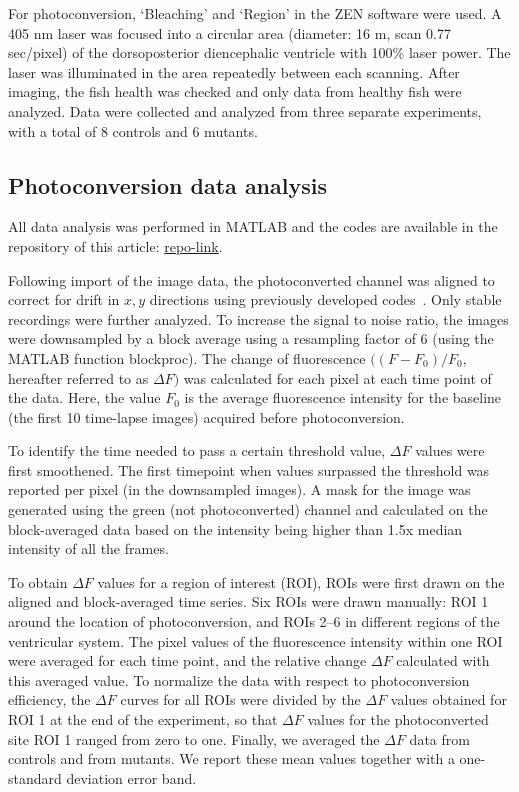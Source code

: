 \documentclass[fleqn]{wlscirep}
\begin{document}
For photoconversion, ‘Bleaching’ and ‘Region’ in the ZEN software
were used. A 405 nm laser was focused into a circular area (diameter: 16 \textmu m, scan 0.77 \textmu sec/pixel)
of the dorsoposterior diencephalic ventricle with 100\% laser power.
The laser was illuminated in the area repeatedly between each scanning.
After imaging, the fish health was checked and only data from healthy fish were analyzed.
Data were collected and analyzed from three separate experiments,
with a total of 8 controls and 6 mutants.

\subsection*{Photoconversion data analysis}
All data analysis was performed in MATLAB and the codes are available in
the repository of this article: \url{repo-link}.

Following import of the image data, the photoconverted channel
was aligned to correct for drift in $x,y$ directions using previously
developed codes~\cite{Reiten2017Motile-Cilia-MediatedComputations, Ringers2023NovelEpithelia}.
Only stable recordings were further analyzed. 
To increase the signal to noise ratio, the images were downsampled by
a block average using a resampling factor of 6 (using the MATLAB function blockproc).
The change of fluorescence $($$(F-F_0)/F_0$, hereafter referred to as
$\Delta F$$)$ was calculated for each pixel at each time point of the data.
Here, the value $F_0$ is the average fluorescence intensity for the
baseline (the first 10 time-lapse images) acquired before photoconversion. 

To identify the time needed to pass a certain threshold value,
$\Delta F$ values were first smoothened.
The first timepoint when values surpassed the threshold was reported
per pixel (in the downsampled images).
A mask for the image was generated using the green (not photoconverted)
channel and calculated on the block-averaged data based on the intensity
being higher than 1.5x median intensity of all the frames.

To obtain $\Delta F$ values for a region of interest (ROI), ROIs were
first drawn on the aligned and block-averaged time series.
Six ROIs were drawn manually: ROI 1 around the location of photoconversion,
and ROIs 2--6 in different regions of the ventricular system.
The pixel values of the fluorescence intensity within one ROI were
averaged for each time point, and the relative change $\Delta F$ calculated with this averaged value.
To normalize the data with respect to photoconversion efficiency, the
$\Delta F$ curves for all ROIs were divided by the $\Delta F$ values
obtained for ROI 1 at the end of the experiment,
so that $\Delta F$ values for the photoconverted site ROI 1 ranged from
zero to one. Finally, we averaged the $\Delta F$ data from controls and from mutants.
We report these mean values together with a one-standard deviation error band.
\end{document}

